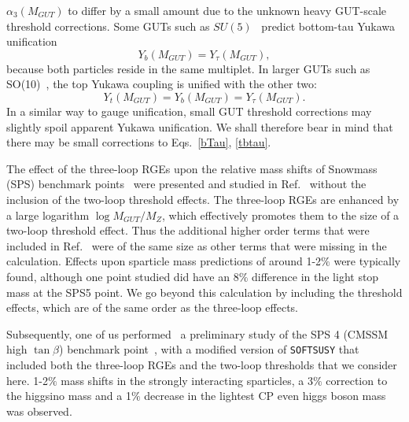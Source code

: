 \documentclass[final,3p,times,pdflatex]{elsarticle}
\begin{document}
$\alpha_3(M_{GUT})$ to 
differ by a small amount due to the unknown heavy GUT-scale threshold
corrections.  
Some GUTs such as $SU(5)$~\cite{su5,su5b} predict bottom-tau
Yukawa unification 
\begin{equation}
Y_b(M_{GUT})=Y_\tau(M_{GUT}), \label{bTau}
\end{equation}
because both
particles reside in the same multiplet. In larger GUTs such as
SO(10)~\cite{Carena:1994bv}, the top  
Yukawa coupling is unified with the other two:
\begin{equation}
Y_t(M_{GUT})=Y_b(M_{GUT})=Y_\tau(M_{GUT}). \label{tbtau}
\end{equation}
In a similar way to gauge unification, small GUT threshold corrections may
slightly spoil apparent Yukawa unification. We shall therefore bear in mind
that there 
may be small corrections to Eqs.~\ref{bTau}, \ref{tbtau}.

The effect of the three-loop RGEs upon the relative mass shifts 
of Snowmass (SPS) benchmark 
points~\cite{Allanach:2002nj} were presented and studied in 
Ref.~\cite{Jack:2004ch} 
without the inclusion of the two-loop threshold effects. 
The three-loop RGEs are enhanced by a large logarithm $\log M_{GUT}/M_Z$,
which effectively promotes them to the size of a two-loop threshold effect. 
Thus the additional higher order terms that were included in
Ref.~\cite{Jack:2004ch} were of the same size as other terms that were
missing in the calculation. Effects upon sparticle mass predictions of around
1-2$\%$ were typically found, although one point studied did have an 8$\%$
difference in the light stop mass at the SPS5 point. 
We go beyond this calculation by including the threshold effects, which are of
the same order as the three-loop effects.

Subsequently, one of us performed~\cite{Bednyakov:2010ni} a preliminary study
of the SPS 4 (CMSSM high
$\tan \beta$) benchmark
point~\cite{Allanach:2002nj}, with a modified version of {\tt SOFTSUSY} that
included both the three-loop RGEs and the two-loop thresholds that we consider
here. 1-2$\%$ mass shifts in the strongly interacting sparticles, a 3$\%$
correction to the higgsino mass and a 1$\%$ decrease in the lightest CP even
higgs boson mass was observed. 
\end{document}
